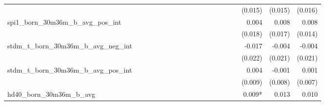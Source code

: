\begin{tabular}{lrrrrrrrrrrrrrrrrrr}
                                            &              &              &              &              &              &              &              &              &               &              &              &               &              &              &               &      (0.015) &      (0.015) &       (0.016) \\ 
spi1\_born\_30m36m\_b\_avg\_pos\_int        &              &              &              &              &              &              &              &              &               &              &              &               &              &              &               &        0.004 &        0.008 &         0.008 \\ 
                                            &              &              &              &              &              &              &              &              &               &              &              &               &              &              &               &      (0.018) &      (0.017) &       (0.014) \\ 
stdm\_t\_born\_30m36m\_b\_avg\_neg\_int     &              &              &              &              &              &              &              &              &               &              &              &               &              &              &               &       -0.017 &       -0.004 &        -0.004 \\ 
                                            &              &              &              &              &              &              &              &              &               &              &              &               &              &              &               &      (0.022) &      (0.021) &       (0.021) \\ 
stdm\_t\_born\_30m36m\_b\_avg\_pos\_int     &              &              &              &              &              &              &              &              &               &              &              &               &              &              &               &        0.004 &       -0.001 &         0.001 \\ 
                                            &              &              &              &              &              &              &              &              &               &              &              &               &              &              &               &      (0.009) &      (0.008) &       (0.007) \\ 
hd40\_born\_30m36m\_b\_avg                  &              &              &              &              &              &              &              &              &               &              &              &               &              &              &               &       0.009* &        0.013 &         0.010 \\ 

\end{tabular}
